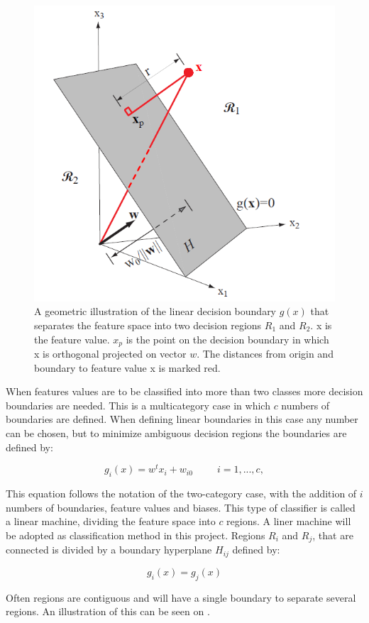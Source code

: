\begin{figure}[H]                 
	\includegraphics[width=.4\textwidth]{figures/xBackground/geolda}  
	\caption{A geometric illustration of the linear decision boundary $g(x)$ that separates the feature space into two decision regions $R_1$ and $R_2$. x is the feature value. $x_p$ is the point on the decision boundary in which x is orthogonal projected on vector $w$. The distances from origin and boundary to feature value x is marked red. \cite{Duda2000}}
	\label{fig:geolda} 
\end{figure}

When features values are to be classified into more than two classes more decision boundaries are needed. This is a multicategory case in which $c$ numbers of boundaries are defined. When defining linear boundaries in this case any number can be chosen, but to minimize ambiguous decision regions the boundaries are defined by: \cite{Duda2000}

\begin{equation} \label{eq:multicase}
g_{i}(x) = w^tx_{i} +w_{i0} ~~~~~~~~~~~ i = 1,...,c,
\end{equation}

This equation follows the notation of the two-category case, with the addition of $i$ numbers of boundaries, feature values and biases. This type of classifier is called a linear machine, dividing the feature space into $c$ regions. A liner machine will be adopted as classification method in this project. Regions $R_i$ and $R_j$, that are connected is divided by a boundary hyperplane $H_{ij}$ defined by: \cite{Duda2000}

\begin{equation}
g_i(x) = g_j(x)
\end{equation}

Often regions are contiguous and will have a single boundary to separate several regions. \cite{Duda2000} An illustration of this can be seen on . 

